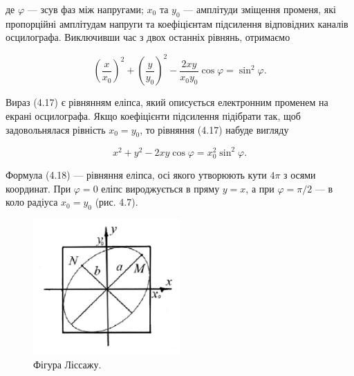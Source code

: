 \documentclass[12pt,a4paper]{article}
\begin{document}
    де $\varphi$ --- зсув фаз між напругами; $x_0$ та $y_0$ --- амплітуди зміщення променя,
    які пропорційні амплітудам напруги та коефіцієнтам
    підсилення відповідних каналів осцилографа.
    Виключивши час з двох останніх рівнянь, отримаємо

    \vspace{0.5em}

    \begin{equation}
        \left( \frac{x}{x_0} \right)^2 + \left( \frac{y}{y_0} \right)^2 - \frac{2xy}{x_0 y_0} \cos \varphi = \sin^2 \varphi.
        \tag{4.17}
    \end{equation}

    \vspace{0.5em}

    Вираз (4.17) є рівнянням еліпса, який описується електронним
    променем на екрані осцилографа.
    Якщо коефіцієнти підсилення підібрати так,
    щоб задовольнялася рівність $x_0 = y_0$, то рівняння (4.17)
    набуде вигляду

    \vspace{0.5em}

    \begin{equation}
        x^2 + y^2 -2xy \cos \varphi = x_0^2 \sin^2 \varphi.
        \tag{4.18}
    \end{equation}

    \vspace{0.5em}

    Формула (4.18) --- рівняння еліпса, осі якого утворюють кути
    $4\pi$ з осями координат.
    При $\varphi = 0$ еліпс вироджується в пряму $y = x$,
    а при $\varphi = \pi / 2$ --- в коло радіуса $x_0 = y_0$ (рис. 4.7).

    \begin{figure}[h!]

        \renewcommand{\thefigure}{4.\arabic{figure}} %

        \centering
        \includegraphics[width=0.5\textwidth]{4.7.png}
        \caption{Фігура Ліссажу.}
        \label{fig7:schema}

    \end{figure}
\end{document}
